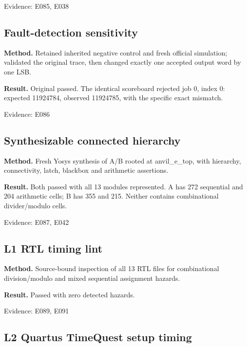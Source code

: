\documentclass[11pt,a4paper]{article}
\begin{document}
{\small Evidence: E085,\allowbreak{} E038}

\subsection{Fault-detection sensitivity}

\textbf{Method.} Retained inherited negative control and fresh official simulation; validated the original trace,\allowbreak{} then changed exactly one accepted output word by one LSB.

\textbf{Result.} Original passed. The identical scoreboard rejected job 0,\allowbreak{} index 0: expected 11924784,\allowbreak{} observed 11924785,\allowbreak{} with the specific exact mismatch.

{\small Evidence: E086}

\subsection{Synthesizable connected hierarchy}

\textbf{Method.} Fresh Yosys synthesis of A/\allowbreak{}B rooted at anvil\_\allowbreak{}e\_\allowbreak{}top,\allowbreak{} with hierarchy,\allowbreak{} connectivity,\allowbreak{} latch,\allowbreak{} blackbox and arithmetic assertions.

\textbf{Result.} Both passed with all 13 modules represented. A has 272 sequential and 204 arithmetic cells; B has 355 and 215. Neither contains combinational divider/\allowbreak{}modulo cells.

{\small Evidence: E087,\allowbreak{} E042}

\subsection{L1 RTL timing lint}

\textbf{Method.} Source-bound inspection of all 13 RTL files for combinational division/\allowbreak{}modulo and mixed sequential assignment hazards.

\textbf{Result.} Passed with zero detected hazards.

{\small Evidence: E089,\allowbreak{} E091}

\subsection{L2 Quartus TimeQuest setup timing}
\end{document}
